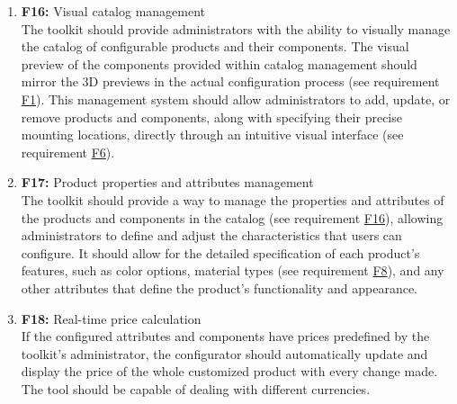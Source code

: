 \begin{enumerate}
\item \textbf{F16:} \label{itm:F16} Visual catalog management
\vspace{2pt}
\\The toolkit should provide administrators with the ability to visually manage the catalog of configurable products and their components. The visual preview of the components provided within catalog management should mirror the 3D previews in the actual configuration process (see requirement \hyperref[itm:F1]{F1}). This management system should allow administrators to add, update, or remove products and components, along with specifying their precise mounting locations, directly through an intuitive visual interface (see requirement \hyperref[itm:F6]{F6}).
\vspace{4pt}

\item \textbf{F17:} \label{itm:F17} Product properties and attributes management
\vspace{2pt}
\\The toolkit should provide a way to manage the properties and attributes of the products and components in the catalog (see requirement \hyperref[itm:F16]{F16}), allowing administrators to define and adjust the characteristics that users can configure. It should allow for the detailed specification of each product's features, such as color options, material types (see requirement \hyperref[itm:F8]{F8}), and any other attributes that define the product's functionality and appearance.
\vspace{4pt}


\item \textbf{F18:} \label{itm:F18} Real-time price calculation
\vspace{2pt}
\\If the configured attributes and components have prices predefined by the toolkit's administrator, the configurator should automatically update and display the price of the whole customized product with every change made. The tool should be capable of dealing with different currencies.
\vspace{4pt}


\end{enumerate}
